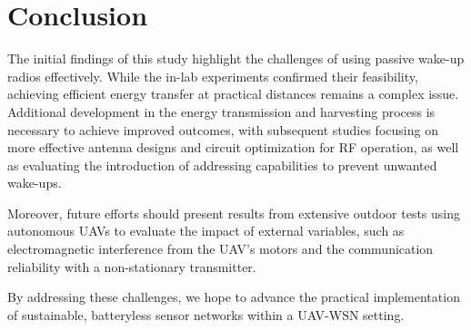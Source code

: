 \documentclass[conference]{IEEEtran}
\begin{document}
\section{Conclusion}

The initial findings of this study highlight the challenges of using passive wake-up radios effectively. While the in-lab experiments confirmed their feasibility, achieving efficient energy transfer at practical distances remains a complex issue. Additional development in the energy transmission and harvesting process is necessary to achieve improved outcomes, with subsequent studies focusing on more effective antenna designs and circuit optimization for RF operation, as well as evaluating the introduction of addressing capabilities to prevent unwanted wake-ups.

Moreover, future efforts should present results from extensive outdoor tests using autonomous UAVs to evaluate the impact of external variables, such as electromagnetic interference from the UAV's motors and the communication reliability with a non-stationary transmitter.

By addressing these challenges, we hope to advance the practical implementation of sustainable, batteryless sensor networks within a UAV-WSN setting.



\end{document}
